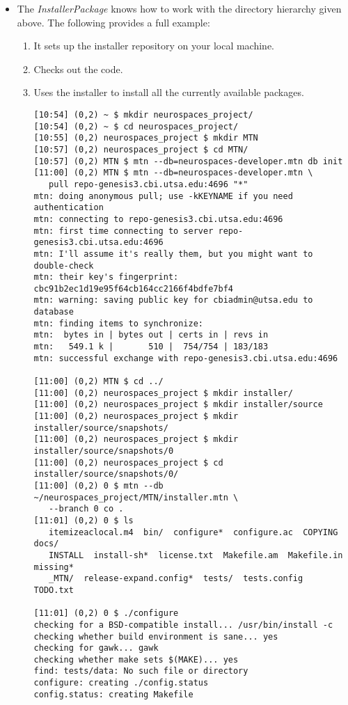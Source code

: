 \documentclass[12pt]{article}
\begin{document}
\begin{itemize}
\item The {\it InstallerPackage} knows how to work with the directory hierarchy given above. The following provides a full example:

\begin{enumerate}
\item It sets up the installer repository on your local machine.
\item Checks out the code.
\item Uses the installer to install all the currently available packages.
\begin{verbatim}
[10:54] (0,2) ~ $ mkdir neurospaces_project/
[10:54] (0,2) ~ $ cd neurospaces_project/
[10:55] (0,2) neurospaces_project $ mkdir MTN
[10:57] (0,2) neurospaces_project $ cd MTN/
[10:57] (0,2) MTN $ mtn --db=neurospaces-developer.mtn db init
[11:00] (0,2) MTN $ mtn --db=neurospaces-developer.mtn \
   pull repo-genesis3.cbi.utsa.edu:4696 "*"
mtn: doing anonymous pull; use -kKEYNAME if you need authentication
mtn: connecting to repo-genesis3.cbi.utsa.edu:4696
mtn: first time connecting to server repo-genesis3.cbi.utsa.edu:4696
mtn: I'll assume it's really them, but you might want to double-check
mtn: their key's fingerprint: cbc91b2ec1d19e95f64cb164cc2166f4bdfe7bf4
mtn: warning: saving public key for cbiadmin@utsa.edu to database
mtn: finding items to synchronize:
mtn:  bytes in | bytes out | certs in | revs in
mtn:   549.1 k |       510 |  754/754 | 183/183
mtn: successful exchange with repo-genesis3.cbi.utsa.edu:4696

[11:00] (0,2) MTN $ cd ../
[11:00] (0,2) neurospaces_project $ mkdir installer/
[11:00] (0,2) neurospaces_project $ mkdir installer/source
[11:00] (0,2) neurospaces_project $ mkdir installer/source/snapshots/
[11:00] (0,2) neurospaces_project $ mkdir installer/source/snapshots/0
[11:00] (0,2) neurospaces_project $ cd installer/source/snapshots/0/
[11:00] (0,2) 0 $ mtn --db ~/neurospaces_project/MTN/installer.mtn \
   --branch 0 co .
[11:01] (0,2) 0 $ ls
   itemizeaclocal.m4  bin/  configure*  configure.ac  COPYING  docs/ 
   INSTALL  install-sh*  license.txt  Makefile.am  Makefile.in  missing* 
   _MTN/  release-expand.config*  tests/  tests.config  TODO.txt

[11:01] (0,2) 0 $ ./configure 
checking for a BSD-compatible install... /usr/bin/install -c
checking whether build environment is sane... yes
checking for gawk... gawk
checking whether make sets $(MAKE)... yes
find: tests/data: No such file or directory
configure: creating ./config.status
config.status: creating Makefile


\end{verbatim}
\end{enumerate}
\end{itemize}
\end{document}
